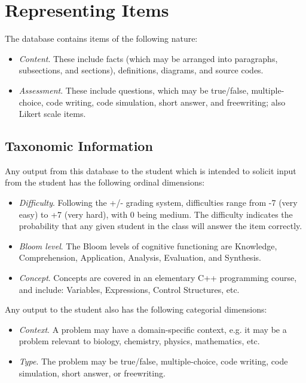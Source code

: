 \section{Representing Items}


The database contains items of the following nature:

\begin{itemize}

  \item \emph{Content}.  These include facts (which may be arranged into
  paragraphs, subsections, and sections), definitions, diagrams, and source
  codes.

  \item \emph{Assessment}.  These include questions, which may be true/false,
  multiple-choice, code writing, code simulation, short answer, and
  freewriting; also Likert scale items.

\end{itemize}

\subsection{Taxonomic Information}

Any output from this database to the student which is intended to solicit input
from the student has the following ordinal dimensions:

\begin{itemize}

  \item \emph{Difficulty}. Following the +/- grading system, difficulties range
  from -7 (very easy) to +7 (very hard), with 0 being medium. The difficulty
  indicates the probability that any given student in the class will answer the
  item correctly.

  \item \emph{Bloom level}.  The Bloom levels of cognitive functioning are
  Knowledge, Comprehension, Application, Analysis, Evaluation, and Synthesis.

  \item \emph{Concept}.  Concepts are covered in an elementary C++
  programming course, and include: Variables, Expressions, Control Structures,
  etc.

\end{itemize}

Any output to the student also has the following categorial dimensions:

\begin{itemize}

  \item \emph{Context}.  A problem may have a domain-specific context, e.g. it
  may be a problem relevant to biology, chemistry, physics, mathematics, etc.

  \item \emph{Type}.  The problem may be true/false, multiple-choice, code
  writing, code simulation, short answer, or freewriting.

\end{itemize}

